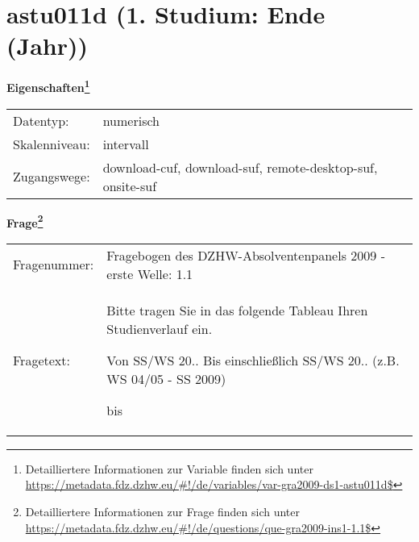 
    \setcounter{footnote}{0}

    \vspace*{-1.8cm}
	\section{astu011d (1. Studium: Ende (Jahr))}
	\label{section:astu011d}



    \vspace*{0.5cm}
    \noindent\textbf{Eigenschaften\footnote{Detailliertere Informationen zur Variable finden sich unter
		\url{https://metadata.fdz.dzhw.eu/\#!/de/variables/var-gra2009-ds1-astu011d$}}}\\
	\begin{tabularx}{\hsize}{@{}lX}
	Datentyp: & numerisch \\
	Skalenniveau: & intervall \\
	Zugangswege: &
	  download-cuf, 
	  download-suf, 
	  remote-desktop-suf, 
	  onsite-suf
 \\
    \end{tabularx}



				\vspace*{0.5cm}
                \noindent\textbf{Frage\footnote{Detailliertere Informationen zur Frage finden sich unter
		              \url{https://metadata.fdz.dzhw.eu/\#!/de/questions/que-gra2009-ins1-1.1$}}}\\
				\begin{tabularx}{\hsize}{@{}lX}
					Fragenummer: &
					  Fragebogen des DZHW-Absolventenpanels 2009 - erste Welle:
					  1.1
 \\
					Fragetext: & Bitte tragen Sie in das folgende Tableau Ihren Studienverlauf ein.\par  Von SS/WS 20.. Bis einschließlich SS/WS 20.. (z.B. WS 04/05 - SS 2009)\par  bis \\
				\end{tabularx}





